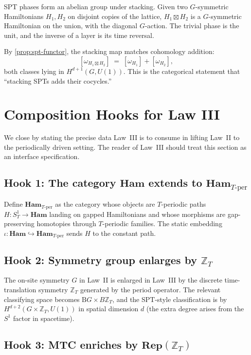 \documentclass[12pt]{article}
\theoremstyle{plain}
\theoremstyle{definition}
\theoremstyle{remark}
\newcommand{\Ham}{\mathbf{Ham}}
\newcommand{\Rep}{\mathbf{Rep}}
\newcommand{\BG}{\mathrm{B}G}
\begin{document}
SPT phases form an abelian group under stacking. Given two $G$-symmetric Hamiltonians
$H_{1},H_{2}$ on disjoint copies of the lattice, $H_{1}\boxtimes H_{2}$ is a
$G$-symmetric Hamiltonian on the union, with the diagonal $G$-action. The trivial
phase is the unit, and the inverse of a layer is its time reversal.

By \cref{prop:spt-functor}, the stacking map matches cohomology addition:
\[
[\omega_{H_{1}\boxtimes H_{2}}] \;=\; [\omega_{H_{1}}] + [\omega_{H_{2}}],
\]
both classes lying in $H^{d+1}(G,U(1))$.
This is the categorical statement that ``stacking SPTs adds their cocycles.''

\section{Composition Hooks for Law III}
\label{sec:law3-hooks}

We close by stating the precise data Law~III is to consume in lifting Law~II to the
periodically driven setting. The reader of Law~III should treat this section as an
interface specification.

\subsection{\texorpdfstring{Hook 1: The category $\Ham$ extends to $\Ham_{T\text{-per}}$}{Hook 1: Ham extends to Ham_T-per}}

Define $\Ham_{T\text{-per}}$ as the category whose objects are
$T$-periodic paths $H:S^{1}_{T}\to\Ham$ landing on gapped Hamiltonians and whose
morphisms are gap-preserving homotopies through $T$-periodic families. The static
embedding $\iota:\Ham\hookrightarrow\Ham_{T\text{-per}}$ sends $H$ to the constant path.

\subsection{\texorpdfstring{Hook 2: Symmetry group enlarges by $\mathbb{Z}_{T}$}{Hook 2: Symmetry group enlarges by Z_T}}

The on-site symmetry $G$ in Law~II is enlarged in Law~III by the discrete
time-translation symmetry $\mathbb{Z}_{T}$ generated by the period operator. The relevant
classifying space becomes $\BG\times B\mathbb{Z}_{T}$, and the SPT-style classification
is by $H^{d+2}(G\times\mathbb{Z}_{T},U(1))$ in spatial dimension $d$ (the extra degree
arises from the $S^{1}$ factor in spacetime).

\subsection{\texorpdfstring{Hook 3: MTC enriches by $\Rep(\mathbb{Z}_{T})$}{Hook 3: MTC enriches by Rep(Z_T)}}
\end{document}

